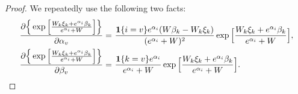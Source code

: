 \begin{proof}
We repeatedly use the following two facts:
\begin{align*}
\frac{\partial\Big\{\exp\Big[\frac{W_k\xi_k+e^{\alpha_i}\beta_k}{e^{\alpha_i}+W}\Big]\Big\}}{\partial \alpha_v} = &~ \frac{\bm{1}\{i=v\}e^{\alpha_i}(W\beta_k-W_k\xi_k)}{(e^{\alpha_i}+W)^2} \exp\Big[\frac{W_k\xi_k+e^{\alpha_i}\beta_k}{e^{\alpha_i}+W}\Big],
\nonumber\\
\frac{\partial\Big\{\exp\Big[\frac{W_k\xi_k+e^{\alpha_i}\beta_k}{e^{\alpha_i}+W}\Big]\Big\}}{\partial \beta_v} = &~ \frac{\bm{1}\{k=v\}e^{\alpha_i}}{e^{\alpha_i}+W} \exp\Big[\frac{W_k\xi_k+e^{\alpha_i}\beta_k}{e^{\alpha_i}+W}\Big].
\nonumber
\end{align*}


\end{proof}
